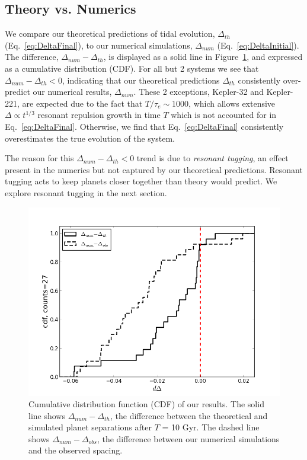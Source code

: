 \subsection{Theory vs. Numerics}
\label{sec:th_v_num}
We compare our theoretical predictions of tidal evolution, $\Delta_{th}$ (Eq.~\ref{eq:DeltaFinal}), to our numerical simulations, $\Delta_{num}$ (Eq.~\ref{eq:DeltaInitial}). 
The difference, $\Delta_{num} - \Delta_{th}$, is displayed as a solid line in Figure~\ref{fig:th_v_num}, and expressed as a cumulative distribution (CDF).
For all but 2 systems we see that $\Delta_{num} - \Delta_{th} < 0$, indicating that our theoretical predictions $\Delta_{th}$ consistently over-predict our numerical results, $\Delta_{num}$. 
These 2 exceptions, Kepler-32 and Kepler-221, are expected due to the fact that $T/\tau_e \sim 1000$, which allows extensive $\Delta \propto t^{1/3}$ resonant repulsion growth \citep{LithwickWu2012} in time $T$ which is not accounted for in Eq.~\ref{eq:DeltaFinal}.
Otherwise, we find that Eq.~\ref{eq:DeltaFinal} consistently overestimates the true evolution of the system.


The reason for this $\Delta_{num} - \Delta_{th} < 0$ trend is due to \textit{resonant tugging}, an effect present in the numerics but not captured by our theoretical predictions.
Resonant tugging acts to keep planets closer together than theory would predict. We explore resonant tugging in the next section. 

\begin{figure}
\centerline{\includegraphics[trim=0cm 0cm 0.5cm 1cm, scale=0.48]{chap3/dDelta.png}}
\caption{Cumulative distribution function (CDF) of our results. The solid line shows $\Delta_{num} - \Delta_{th}$, the difference between the theoretical and simulated planet separations after $T$ = 10 Gyr. The dashed line shows $\Delta_{num} - \Delta_{obs}$, the difference between our numerical simulations and the observed \kep{} spacing.
}
\label{fig:th_v_num}
\end{figure}

